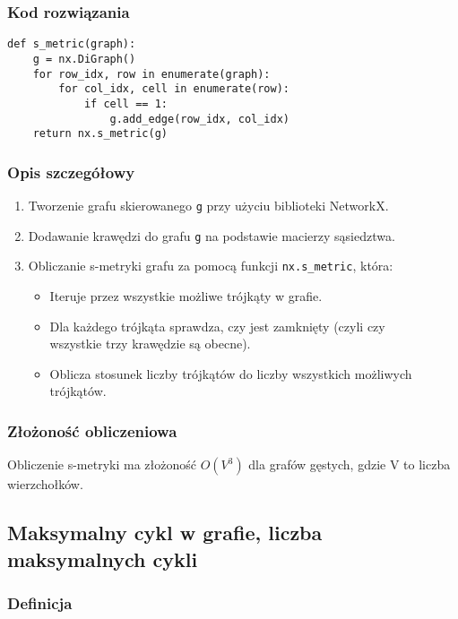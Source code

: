 \documentclass[a4paper, 12pt]{article}
\begin{document}
\subsubsection*{Kod rozwiązania}

\begin{verbatim}
def s_metric(graph):
    g = nx.DiGraph()
    for row_idx, row in enumerate(graph):
        for col_idx, cell in enumerate(row):
            if cell == 1:
                g.add_edge(row_idx, col_idx)
    return nx.s_metric(g)
\end{verbatim}

\subsubsection*{Opis szczegółowy}

\begin{enumerate}
    \item Tworzenie grafu skierowanego \texttt{g} przy użyciu biblioteki NetworkX.
    \item Dodawanie krawędzi do grafu \texttt{g} na podstawie macierzy sąsiedztwa.
    \item Obliczanie s-metryki grafu za pomocą funkcji \texttt{nx.s\_metric}, która:
    \begin{itemize}
        \item Iteruje przez wszystkie możliwe trójkąty w grafie.
        \item Dla każdego trójkąta sprawdza, czy jest zamknięty (czyli czy \\wszystkie trzy krawędzie są obecne).
        \item Oblicza stosunek liczby trójkątów do liczby wszystkich możliwych trójkątów.
    \end{itemize}
\end{enumerate}

\subsubsection*{Złożoność obliczeniowa}

Obliczenie s-metryki ma złożoność $O(V^3)$ dla grafów gęstych, gdzie V to liczba wierzchołków.

\subsection{Maksymalny cykl w grafie, liczba maksymalnych cykli}

\subsubsection*{Definicja}
\end{document}
